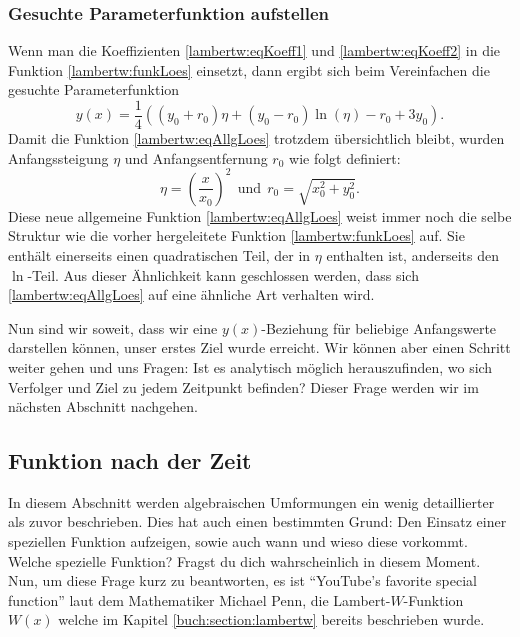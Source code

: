 \subsubsection{Gesuchte Parameterfunktion aufstellen
	\label{lambertw:subsubsection:ParamFunk}}
Wenn man die Koeffizienten \eqref{lambertw:eqKoeff1} und \eqref{lambertw:eqKoeff2} in die Funktion \eqref{lambertw:funkLoes} einsetzt, dann ergibt sich beim Vereinfachen die gesuchte Parameterfunktion
\begin{equation}
	y(x)
	=
	\frac{1}{4}\left(\left(y_0+r_0\right)\eta+\left(y_0-r_0\right)\operatorname{ln}\left(\eta\right)-r_0+3y_0\right).
	\label{lambertw:eqAllgLoes}
\end{equation}
Damit die Funktion \eqref{lambertw:eqAllgLoes} trotzdem übersichtlich bleibt, wurden Anfangssteigung \(\eta\) und Anfangsentfernung \(r_0\) wie folgt definiert:
\begin{equation}
	\eta
	=
	\left(\frac{x}{x_0}\right)^2
	\:\:\text{und}\:\:
	r_0
	=
	\sqrt{x_0^2+y_0^2}.
\end{equation}
Diese neue allgemeine Funktion \eqref{lambertw:eqAllgLoes} weist immer noch die selbe Struktur wie die vorher hergeleitete Funktion \eqref{lambertw:funkLoes} auf. Sie enthält einerseits einen quadratischen Teil, der in \(\eta\) enthalten ist, anderseits den \(\operatorname{ln}\)-Teil. Aus dieser Ähnlichkeit kann geschlossen werden, dass sich \eqref{lambertw:eqAllgLoes} auf eine ähnliche Art verhalten wird.

Nun sind wir soweit, dass wir eine \(y(x)\)-Beziehung für beliebige Anfangswerte darstellen können, unser erstes Ziel wurde erreicht. Wir können aber einen Schritt weiter gehen und uns Fragen: Ist es analytisch möglich herauszufinden, wo sich Verfolger und Ziel zu jedem Zeitpunkt befinden? Dieser Frage werden wir im nächsten Abschnitt nachgehen.

\subsection{Funktion nach der Zeit 
	\label{lambertw:subsection:FunkNachT}}
In diesem Abschnitt werden algebraischen Umformungen ein wenig detaillierter als zuvor beschrieben. Dies hat auch einen bestimmten Grund: Den Einsatz einer speziellen Funktion aufzeigen, sowie auch wann und wieso diese vorkommt. Welche spezielle Funktion? Fragst du dich wahrscheinlich in diesem Moment. Nun, um diese Frage kurz zu beantworten, es ist ``YouTube's favorite special function'' laut dem Mathematiker Michael Penn, die Lambert-\(W\)-Funktion \(W(x)\) welche im Kapitel \ref{buch:section:lambertw} bereits beschrieben wurde.


